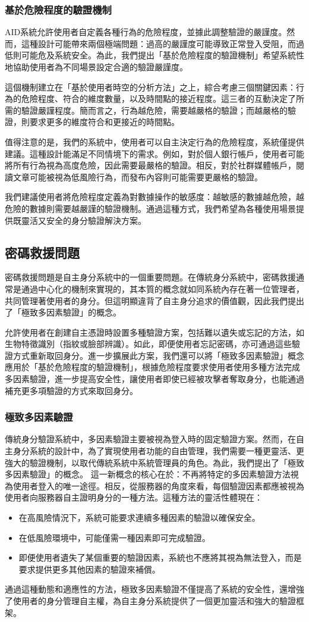 \subsubsection{基於危險程度的驗證機制}
AID系統允許使用者自定義各種行為的危險程度，並據此調整驗證的嚴謹度。然而，這種設計可能帶來兩個極端問題：過高的嚴謹度可能導致正常登入受阻，而過低則可能危及系統安全。為此，我們提出「基於危險程度的驗證機制」希望系統性地協助使用者為不同場景設定合適的驗證嚴謹度。

這個機制建立在「基於使用者時空的分析方法」之上，綜合考慮三個關鍵因素：行為的危險程度、符合的維度數量，以及時間點的接近程度。這三者的互動決定了所需的驗證嚴謹程度。簡而言之，行為越危險，需要越嚴格的驗證；而越嚴格的驗證，則要求更多的維度符合和更接近的時間點。

值得注意的是，我們的系統中，使用者可以自主決定行為的危險程度，系統僅提供建議。這種設計能滿足不同情境下的需求。例如，對於個人銀行帳戶，使用者可能將所有行為視為高度危險，因此需要最嚴格的驗證。相反，對於社群媒體帳戶，閱讀文章可能被視為低風險行為，而發布內容則可能需要更嚴格的驗證。

我們建議使用者將危險程度定義為對數據操作的敏感度：越敏感的數據越危險，越危險的數據則需要越嚴謹的驗證機制。通過這種方式，我們希望為各種使用場景提供既靈活又安全的身分驗證解決方案。
\subsection{密碼救援問題}
密碼救援問題是自主身分系統中的一個重要問題。在傳統身分系統中，密碼救援通常是通過中心化的機制來實現的，其本質的概念就如同系統內存在著一位管理者，共同管理著使用者的身分。但這明顯違背了自主身分追求的價值觀，因此我們提出了「極致多因素驗證」的概念。

允許使用者在創建自主憑證時設置多種驗證方案，包括難以遺失或忘記的方法，如生物特徵識別（指紋或臉部辨識）。如此，即便使用者忘記密碼，亦可通過這些驗證方式重新取回身分。進一步擴展此方案，我們還可以將「極致多因素驗證」概念應用於「基於危險程度的驗證機制」，根據危險程度要求使用者使用多種方法完成多因素驗證，進一步提高安全性，讓使用者即使已經被攻擊者奪取身分，也能通過補充更多項驗證的方式來取回身分。
\subsubsection{極致多因素驗證}
傳統身分驗證系統中，多因素驗證主要被視為登入時的固定驗證方案。然而，在自主身分系統的設計中，為了實現使用者功能的自由管理，我們需要一種更靈活、更強大的驗證機制，以取代傳統系統中系統管理員的角色。為此，我們提出了「極致多因素驗證」的概念。
這一新概念的核心在於：不再將特定的多因素驗證方法視為使用者登入的唯一途徑。相反，從服務器的角度來看，每個驗證因素都應被視為使用者向服務器自主證明身分的一種方法。這種方法的靈活性體現在：
\begin{itemize}
  \item 在高風險情況下，系統可能要求連續多種因素的驗證以確保安全。
  \item 在低風險環境中，可能僅需一種因素即可完成驗證。
  \item 即便使用者遺失了某個重要的驗證因素，系統也不應將其視為無法登入，而是要求提供更多其他因素的驗證來補償。
\end{itemize}
通過這種動態和適應性的方法，極致多因素驗證不僅提高了系統的安全性，還增強了使用者的身分管理自主權，為自主身分系統提供了一個更加靈活和強大的驗證框架。
